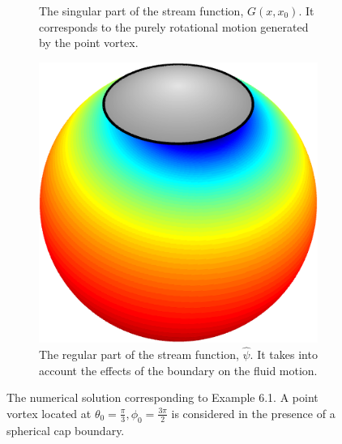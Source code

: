 \documentclass{sfuthesis}
\begin{document}
\begin{figure}[h]
\begin{subfigure}[b]{0.35\textwidth}
                	\caption{The singular part of the stream function, $G(x,x_0)$. It corresponds to the purely rotational motion generated by the point vortex.}
            		 \label{fig: Ex6-1CapSingPart}
       \end{subfigure} \hspace{1cm}
        \begin{subfigure}[b]{0.35\textwidth}
                	\includegraphics[width=\textwidth]{Ex6-1CapRegPart}
                	\caption{The regular part of the stream function, $\hat{\psi}$. It takes into account the effects of the boundary on the fluid motion.}
                	\label{fig: Ex6-1CapRegPart}
       \end{subfigure}
       \caption{The numerical solution corresponding to Example 6.1. A point vortex located at $\theta_0=\frac{\pi}{3}, \phi_0=\frac{3\pi}{2}$ is considered in the presence of a spherical cap boundary. }
      \label{fig: Ex6-1CapInstantaneous}
\end{figure}

\end{document}
